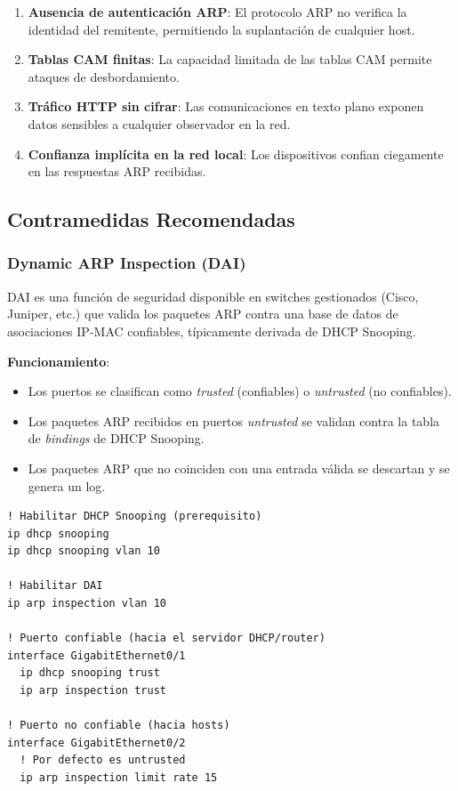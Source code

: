 \documentclass[12pt, a4paper]{article}
\begin{document}
\begin{enumerate}[leftmargin=2cm]
    \item \textbf{Ausencia de autenticaci\'on ARP}: El protocolo ARP no verifica la identidad del remitente, permitiendo la suplantaci\'on de cualquier host.
    \item \textbf{Tablas CAM finitas}: La capacidad limitada de las tablas CAM permite ataques de desbordamiento.
    \item \textbf{Tr\'afico HTTP sin cifrar}: Las comunicaciones en texto plano exponen datos sensibles a cualquier observador en la red.
    \item \textbf{Confianza impl\'icita en la red local}: Los dispositivos confian ciegamente en las respuestas ARP recibidas.
\end{enumerate}

\subsection{Contramedidas Recomendadas}

\subsubsection{Dynamic ARP Inspection (DAI)}

DAI es una funci\'on de seguridad disponible en switches gestionados (Cisco, Juniper, etc.) que valida los paquetes ARP contra una base de datos de asociaciones IP-MAC confiables, t\'ipicamente derivada de DHCP Snooping.

\textbf{Funcionamiento}:
\begin{itemize}[leftmargin=2cm]
    \item Los puertos se clasifican como \textit{trusted} (confiables) o \textit{untrusted} (no confiables).
    \item Los paquetes ARP recibidos en puertos \textit{untrusted} se validan contra la tabla de \textit{bindings} de DHCP Snooping.
    \item Los paquetes ARP que no coinciden con una entrada v\'alida se descartan y se genera un log.
\end{itemize}

\begin{lstlisting}[style=bashstyle, caption={Configuraci\'on de DAI en Cisco IOS}]
! Habilitar DHCP Snooping (prerequisito)
ip dhcp snooping
ip dhcp snooping vlan 10

! Habilitar DAI
ip arp inspection vlan 10

! Puerto confiable (hacia el servidor DHCP/router)
interface GigabitEthernet0/1
  ip dhcp snooping trust
  ip arp inspection trust

! Puerto no confiable (hacia hosts)
interface GigabitEthernet0/2
  ! Por defecto es untrusted
  ip arp inspection limit rate 15
\end{lstlisting}
\end{document}
